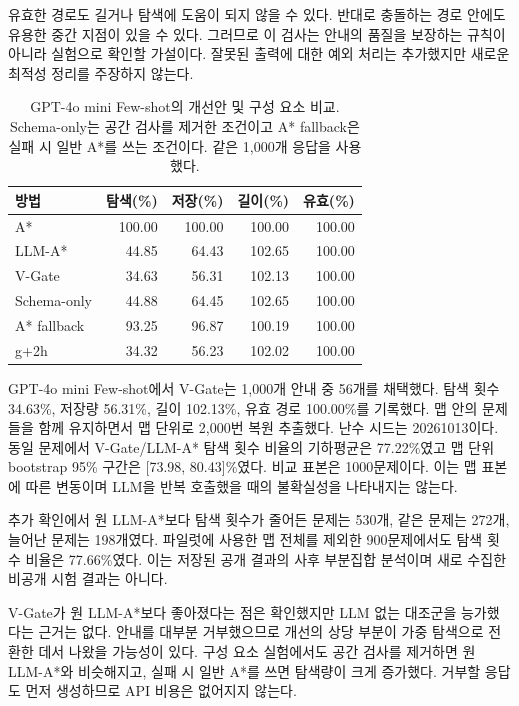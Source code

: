 \documentclass[11pt]{article}
\begin{document}
유효한 경로도 길거나 탐색에 도움이 되지 않을 수 있다. 반대로 충돌하는 경로 안에도 유용한 중간 지점이 있을 수 있다. 그러므로 이 검사는 안내의 품질을 보장하는 규칙이 아니라 실험으로 확인할 가설이다. 잘못된 출력에 대한 예외 처리는 추가했지만 새로운 최적성 정리를 주장하지 않는다.

\begin{table}[t]
\centering\small
\setlength{\tabcolsep}{3pt}
\begin{tabular}{lrrrr}
\toprule
방법 & 탐색(\%) & 저장(\%) & 길이(\%) & 유효(\%)\\
\midrule
A* & 100.00 & 100.00 & 100.00 & 100.00 \\
LLM-A* & 44.85 & 64.43 & 102.65 & 100.00 \\
V-Gate & 34.63 & 56.31 & 102.13 & 100.00 \\
Schema-only & 44.88 & 64.45 & 102.65 & 100.00 \\
A* fallback & 93.25 & 96.87 & 100.19 & 100.00 \\
g+2h & 34.32 & 56.23 & 102.02 & 100.00 \\
\bottomrule
\end{tabular}
\caption{GPT-4o mini Few-shot의 개선안 및 구성 요소 비교. Schema-only는 공간 검사를 제거한 조건이고 A* fallback은 실패 시 일반 A*를 쓰는 조건이다. 같은 1,000개 응답을 사용했다.}
\label{tab:ablation}
\end{table}

GPT-4o mini Few-shot에서 V-Gate는 1,000개 안내 중 56개를 채택했다. 탐색 횟수 34.63\%, 저장량 56.31\%, 길이 102.13\%, 유효 경로 100.00\%를 기록했다. 맵 안의 문제들을 함께 유지하면서 맵 단위로 2,000번 복원 추출했다. 난수 시드는 20261013이다. 동일 문제에서 V-Gate/LLM-A* 탐색 횟수 비율의 기하평균은 77.22\%였고 맵 단위 bootstrap 95\% 구간은 [73.98, 80.43]\%였다. 비교 표본은 1000문제이다. 이는 맵 표본에 따른 변동이며 LLM을 반복 호출했을 때의 불확실성을 나타내지는 않는다.

추가 확인에서 원 LLM-A*보다 탐색 횟수가 줄어든 문제는 530개, 같은 문제는 272개, 늘어난 문제는 198개였다. 파일럿에 사용한 맵 전체를 제외한 900문제에서도 탐색 횟수 비율은 77.66\%였다. 이는 저장된 공개 결과의 사후 부분집합 분석이며 새로 수집한 비공개 시험 결과는 아니다.

V-Gate가 원 LLM-A*보다 좋아졌다는 점은 확인했지만 LLM 없는 대조군을 능가했다는 근거는 없다. 안내를 대부분 거부했으므로 개선의 상당 부분이 가중 탐색으로 전환한 데서 나왔을 가능성이 있다. 구성 요소 실험에서도 공간 검사를 제거하면 원 LLM-A*와 비슷해지고, 실패 시 일반 A*를 쓰면 탐색량이 크게 증가했다. 거부할 응답도 먼저 생성하므로 API 비용은 없어지지 않는다.
\end{document}
